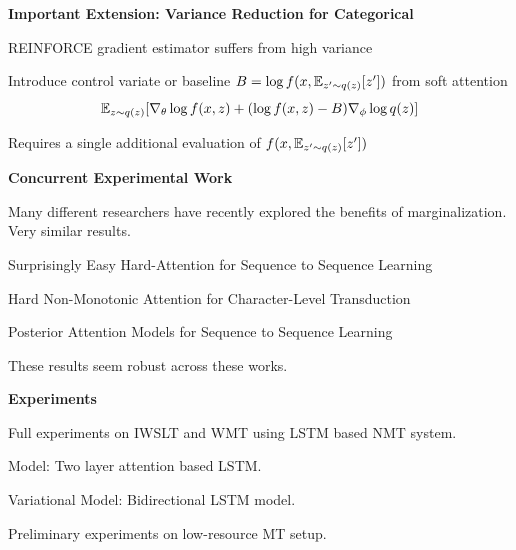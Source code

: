 \documentclass[aspectratio=169]{beamer}
\let\tempone\itemize
\let\temptwo\enditemize
\renewenvironment{itemize}{\tempone\addtolength{\itemsep}{0.5\baselineskip}}{\temptwo}
\newcommand{\thetitle}[1]{{\begin{center}\textbf{{#1}}\end{center}}}
\newcommand{\air}{\vspace{0.25cm}}
\begin{document}
\begin{frame}\thetitle{Important Extension: Variance Reduction for Categorical}
\begin{itemize}
    \item REINFORCE gradient estimator suffers from high variance
    \air
    \item Introduce control variate or baseline $B = \log f(x, \mathbb{E}_{z'\sim q(z)}[z'])$ from soft attention
    \[ \mathbb{E}_{z \sim q(z)} [\nabla_\theta\log f(x,z) + ( \log f(x,z) -
  B)\nabla_\phi \log q(z) ] \]
    \item Requires a single additional evaluation of $f(x,\mathbb{E}_{z'\sim q(z)}[z'])$
\end{itemize}
\end{frame}


\begin{frame}
  \thetitle{Concurrent Experimental Work}

  Many different researchers have recently explored the
  benefits of marginalization. Very similar results.

  \begin{itemize}
  \item Surprisingly Easy Hard-Attention for Sequence to Sequence Learning
  \item Hard Non-Monotonic Attention for Character-Level Transduction
  \item Posterior Attention Models for Sequence to Sequence Learning
  \end{itemize}

  These results seem robust across these works.

\end{frame}

\begin{frame}
  \thetitle{Experiments}

  \begin{itemize}
  \item Full experiments on IWSLT and WMT using LSTM based NMT system.
  \item Model: Two layer attention based LSTM.
  \item Variational Model: Bidirectional LSTM model.
  \item Preliminary experiments on low-resource MT setup.
  \end{itemize}

\end{frame}
\end{document}
